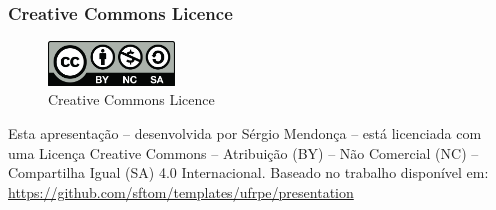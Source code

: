 \documentclass[presentation]{beamer}
\begin{document}
 \begin{frame}[c]\frametitle{Creative Commons Licence}
     \begin{figure}[ht]
          \centering
          \caption{\label{fig:by-nc-sa} Creative Commons Licence}
          \includegraphics[width=0.3\textwidth]{./img/by-nc-sa.jpg}
      \end{figure} 
      Esta apresentação -- desenvolvida por Sérgio Mendonça -- está licenciada com uma Licença Creative Commons -- Atribuição (BY) -- Não Comercial (NC) -- Compartilha Igual (SA) 4.0 Internacional. Baseado no trabalho disponível em:\newline 
      \url{https://github.com/sftom/templates/ufrpe/presentation}
 \end{frame}
\end{document}
